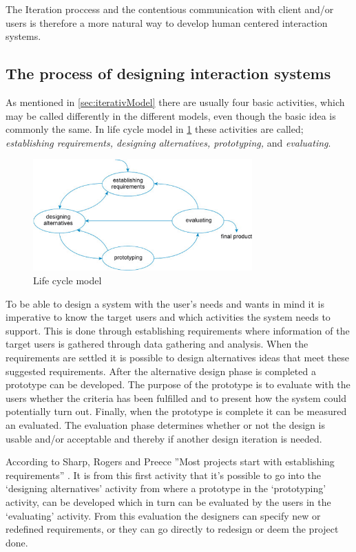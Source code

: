 The Iteration proccess and the contentious communication with client and/or users is therefore a more natural way to develop human centered interaction systems.


\subsection{The process of designing interaction systems}\label{sec:Iterativedesign}
As mentioned in \cref{sec:iterativModel} there are usually four basic activities, which may be called differently in the different models, even though the basic idea is commonly the same.
In life cycle model in \cref{fig:LifeCycleModel} these activities are called;
\textit{establishing requirements, designing alternatives, prototyping,} and \textit{evaluating}. 

\begin{figure}[H]
	\centering
	\includegraphics[width=0.75\textwidth]{billeder/lifecycle.png}
	\caption{Life cycle model \citep[p.~332]{InteractionDesign}}\label{fig:LifeCycleModel}
\end{figure}

To be able to design a system with the user’s needs and wants in mind it is imperative to know the target users and which activities the system needs to support. 
This is done through establishing requirements where information of the target users is gathered through data gathering and analysis. 
When the requirements are settled it is possible to design alternatives ideas that meet these suggested requirements. 
After the alternative design phase is completed a prototype can be developed. 
The purpose of the prototype is to evaluate with the users whether the criteria has been fulfilled and to present how the system could potentially turn out. 
Finally, when the prototype is complete it can be measured an evaluated. 
The evaluation phase determines whether or not the design is usable and/or acceptable and thereby if another design iteration is needed.

According to Sharp, Rogers and Preece ''Most projects start with establishing requirements'' \citep[p.~333]{InteractionDesign}. It is from this first activity that it’s possible to go into the ‘designing alternatives’ activity from where a prototype in the ‘prototyping’ activity, can be developed which in turn can be evaluated by the users in the ‘evaluating’ activity. From this evaluation the designers can specify new or redefined requirements, or they can go directly to redesign or deem the project done. 

